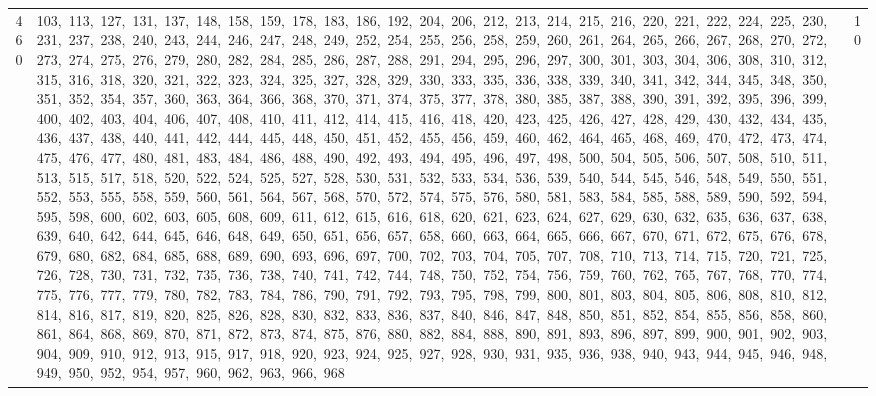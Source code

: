 \begin{longtable}{c|p{}|r}
460 & 103,\ 113,\ 127,\ 131,\ 137,\ 148,\ 158,\ 159,\ 178,\ 183,\ 186,\ 192,\ 204,\ 206,\ 212,\ 213,\ 214,\ 215,\ 216,\ 220,\ 221,\ 222,\ 224,\ 225,\ 230,\ 231,\ 237,\ 238,\ 240,\ 243,\ 244,\ 246,\ 247,\ 248,\ 249,\ 252,\ 254,\ 255,\ 256,\ 258,\ 259,\ 260,\ 261,\ 264,\ 265,\ 266,\ 267,\ 268,\ 270,\ 272,\ 273,\ 274,\ 275,\ 276,\ 279,\ 280,\ 282,\ 284,\ 285,\ 286,\ 287,\ 288,\ 291,\ 294,\ 295,\ 296,\ 297,\ 300,\ 301,\ 303,\ 304,\ 306,\ 308,\ 310,\ 312,\ 315,\ 316,\ 318,\ 320,\ 321,\ 322,\ 323,\ 324,\ 325,\ 327,\ 328,\ 329,\ 330,\ 333,\ 335,\ 336,\ 338,\ 339,\ 340,\ 341,\ 342,\ 344,\ 345,\ 348,\ 350,\ 351,\ 352,\ 354,\ 357,\ 360,\ 363,\ 364,\ 366,\ 368,\ 370,\ 371,\ 374,\ 375,\ 377,\ 378,\ 380,\ 385,\ 387,\ 388,\ 390,\ 391,\ 392,\ 395,\ 396,\ 399,\ 400,\ 402,\ 403,\ 404,\ 406,\ 407,\ 408,\ 410,\ 411,\ 412,\ 414,\ 415,\ 416,\ 418,\ 420,\ 423,\ 425,\ 426,\ 427,\ 428,\ 429,\ 430,\ 432,\ 434,\ 435,\ 436,\ 437,\ 438,\ 440,\ 441,\ 442,\ 444,\ 445,\ 448,\ 450,\ 451,\ 452,\ 455,\ 456,\ 459,\ 460,\ 462,\ 464,\ 465,\ 468,\ 469,\ 470,\ 472,\ 473,\ 474,\ 475,\ 476,\ 477,\ 480,\ 481,\ 483,\ 484,\ 486,\ 488,\ 490,\ 492,\ 493,\ 494,\ 495,\ 496,\ 497,\ 498,\ 500,\ 504,\ 505,\ 506,\ 507,\ 508,\ 510,\ 511,\ 513,\ 515,\ 517,\ 518,\ 520,\ 522,\ 524,\ 525,\ 527,\ 528,\ 530,\ 531,\ 532,\ 533,\ 534,\ 536,\ 539,\ 540,\ 544,\ 545,\ 546,\ 548,\ 549,\ 550,\ 551,\ 552,\ 553,\ 555,\ 558,\ 559,\ 560,\ 561,\ 564,\ 567,\ 568,\ 570,\ 572,\ 574,\ 575,\ 576,\ 580,\ 581,\ 583,\ 584,\ 585,\ 588,\ 589,\ 590,\ 592,\ 594,\ 595,\ 598,\ 600,\ 602,\ 603,\ 605,\ 608,\ 609,\ 611,\ 612,\ 615,\ 616,\ 618,\ 620,\ 621,\ 623,\ 624,\ 627,\ 629,\ 630,\ 632,\ 635,\ 636,\ 637,\ 638,\ 639,\ 640,\ 642,\ 644,\ 645,\ 646,\ 648,\ 649,\ 650,\ 651,\ 656,\ 657,\ 658,\ 660,\ 663,\ 664,\ 665,\ 666,\ 667,\ 670,\ 671,\ 672,\ 675,\ 676,\ 678,\ 679,\ 680,\ 682,\ 684,\ 685,\ 688,\ 689,\ 690,\ 693,\ 696,\ 697,\ 700,\ 702,\ 703,\ 704,\ 705,\ 707,\ 708,\ 710,\ 713,\ 714,\ 715,\ 720,\ 721,\ 725,\ 726,\ 728,\ 730,\ 731,\ 732,\ 735,\ 736,\ 738,\ 740,\ 741,\ 742,\ 744,\ 748,\ 750,\ 752,\ 754,\ 756,\ 759,\ 760,\ 762,\ 765,\ 767,\ 768,\ 770,\ 774,\ 775,\ 776,\ 777,\ 779,\ 780,\ 782,\ 783,\ 784,\ 786,\ 790,\ 791,\ 792,\ 793,\ 795,\ 798,\ 799,\ 800,\ 801,\ 803,\ 804,\ 805,\ 806,\ 808,\ 810,\ 812,\ 814,\ 816,\ 817,\ 819,\ 820,\ 825,\ 826,\ 828,\ 830,\ 832,\ 833,\ 836,\ 837,\ 840,\ 846,\ 847,\ 848,\ 850,\ 851,\ 852,\ 854,\ 855,\ 856,\ 858,\ 860,\ 861,\ 864,\ 868,\ 869,\ 870,\ 871,\ 872,\ 873,\ 874,\ 875,\ 876,\ 880,\ 882,\ 884,\ 888,\ 890,\ 891,\ 893,\ 896,\ 897,\ 899,\ 900,\ 901,\ 902,\ 903,\ 904,\ 909,\ 910,\ 912,\ 913,\ 915,\ 917,\ 918,\ 920,\ 923,\ 924,\ 925,\ 927,\ 928,\ 930,\ 931,\ 935,\ 936,\ 938,\ 940,\ 943,\ 944,\ 945,\ 946,\ 948,\ 949,\ 950,\ 952,\ 954,\ 957,\ 960,\ 962,\ 963,\ 966,\ 968 & 10 \\

\end{longtable}
